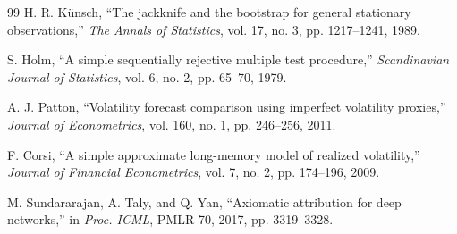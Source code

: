 \documentclass[conference]{IEEEtran}
\begin{document}
\begin{thebibliography}{99}
 H. R. Künsch, ``The jackknife and the bootstrap for general stationary observations,'' \emph{The Annals of Statistics}, vol. 17, no. 3, pp. 1217--1241, 1989.

 S. Holm, ``A simple sequentially rejective multiple test procedure,'' \emph{Scandinavian Journal of Statistics}, vol. 6, no. 2, pp. 65--70, 1979.

 A. J. Patton, ``Volatility forecast comparison using imperfect volatility proxies,'' \emph{Journal of Econometrics}, vol. 160, no. 1, pp. 246--256, 2011.

 F. Corsi, ``A simple approximate long-memory model of realized volatility,'' \emph{Journal of Financial Econometrics}, vol. 7, no. 2, pp. 174--196, 2009.

 M. Sundararajan, A. Taly, and Q. Yan, ``Axiomatic attribution for deep networks,'' in \emph{Proc. ICML}, PMLR 70, 2017, pp. 3319--3328.

\end{thebibliography}
\end{document}
